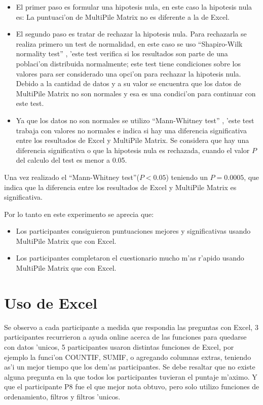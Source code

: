 \begin{itemize}
\item El primer paso es formular una hipotesis nula, en este caso la hipotesis nula es: La puntuaci'on de MultiPile Matrix no es diferente a la de Excel. 
\item El segundo paso es tratar de rechazar la hipotesis nula. Para rechazarla se realiza primero un test de normalidad, en este caso se uso ``Shapiro-Wilk normality test'' \cite{test}, 'este test verifica si los resultados son parte de una poblaci'on distribuida normalmente; este test tiene condiciones sobre los valores para ser considerado una opci'on para rechazar la hipotesis nula. Debido a la cantidad de datos y a su valor se encuentra que los datos de MultiPile Matrix no son normales y esa es una condici'on para continuar con este test.
\item Ya que los datos no son normales se utilizo ``Mann-Whitney test'' \cite{test}, 'este test trabaja con valores no normales e indica si hay una diferencia significativa entre los resultados de Excel y MultiPile Matrix. Se considera que hay una diferencia significativa o que la hipotesis nula es rechazada, cuando el valor $P$ del calculo del test es menor a 0.05.
\end{itemize}

Una vez realizado el ``Mann-Whitney test''($P<0.05$) teniendo un $P = 0.0005$, que indica que la diferencia entre los resultados de Excel y MultiPile Matrix es significativa.

Por lo tanto en este experimento se aprecia que:
\begin{itemize}
\item Los participantes consiguieron puntuaciones mejores y significativas usando MultiPile Matrix que con Excel.
\item Los participantes completaron el cuestionario mucho m'as r'apido usando MultiPile Matrix que con Excel.
\end{itemize}

\section{Uso de Excel}
Se observo a cada participante a medida que respondia las preguntas con Excel, 3 participantes recurrieron a ayuda online acerca de las funciones para quedarse con datos 'unicos, 5 participantes usaron distintas funciones de Excel, por ejemplo la funci'on COUNTIF, SUMIF, o agregando columnas extras, teniendo as'i un mejor tiempo que los dem'as participantes. 
Se debe resaltar que no existe alguna pregunta en la que todos los participantes tuvieran el puntaje m'aximo. Y que el participante P8 fue el que mejor nota obtuvo, pero solo utilizo funciones de ordenamiento, filtros y filtros 'unicos.

